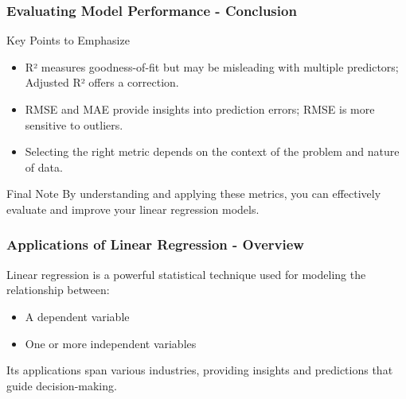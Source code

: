 \documentclass{beamer}
\begin{document}
\begin{frame}[fragile]
    \frametitle{Evaluating Model Performance - Conclusion}
    \begin{block}{Key Points to Emphasize}
        \begin{itemize}
            \item R² measures goodness-of-fit but may be misleading with multiple predictors; Adjusted R² offers a correction.
            \item RMSE and MAE provide insights into prediction errors; RMSE is more sensitive to outliers.
            \item Selecting the right metric depends on the context of the problem and nature of data.
        \end{itemize}
    \end{block}
    \begin{block}{Final Note}
        By understanding and applying these metrics, you can effectively evaluate and improve your linear regression models.
    \end{block}
\end{frame}

\begin{frame}[fragile]
    \frametitle{Applications of Linear Regression - Overview}
    Linear regression is a powerful statistical technique used for modeling the relationship between:
    \begin{itemize}
        \item A dependent variable
        \item One or more independent variables
    \end{itemize} 
    Its applications span various industries, providing insights and predictions that guide decision-making.
\end{frame}
\end{document}
